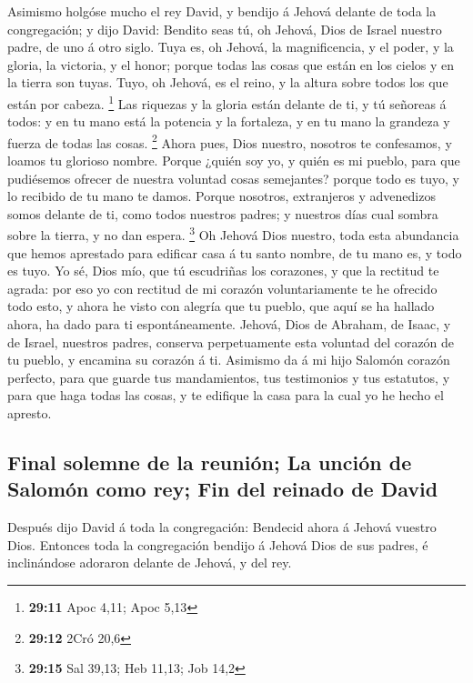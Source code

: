  Asimismo holgóse mucho el rey David, y bendijo á Jehová
delante de toda la congregación; y dijo David: Bendito seas tú, oh
Jehová, Dios de Israel nuestro padre, de uno á otro siglo. 
Tuya es, oh Jehová, la magnificencia, y el poder, y la gloria, la
victoria, y el honor; porque todas las cosas que están en los cielos y
en la tierra son tuyas. Tuyo, oh Jehová, es el reino, y la altura sobre
todos los que están por cabeza. \footnote{\textbf{29:11} Apoc 4,11; Apoc
  5,13}  Las riquezas y la gloria están delante de ti, y tú
señoreas á todos: y en tu mano está la potencia y la fortaleza, y en tu
mano la grandeza y fuerza de todas las cosas. \footnote{\textbf{29:12}
  2Cró 20,6}  Ahora pues, Dios nuestro, nosotros te
confesamos, y loamos tu glorioso nombre.  Porque ¿quién soy
yo, y quién es mi pueblo, para que pudiésemos ofrecer de nuestra
voluntad cosas semejantes? porque todo es tuyo, y lo recibido de tu mano
te damos.  Porque nosotros, extranjeros y advenedizos somos
delante de ti, como todos nuestros padres; y nuestros días cual sombra
sobre la tierra, y no dan espera. \footnote{\textbf{29:15} Sal 39,13;
  Heb 11,13; Job 14,2}  Oh Jehová Dios nuestro, toda esta
abundancia que hemos aprestado para edificar casa á tu santo nombre, de
tu mano es, y todo es tuyo.  Yo sé, Dios mío, que tú
escudriñas los corazones, y que la rectitud te agrada: por eso yo con
rectitud de mi corazón voluntariamente te he ofrecido todo esto, y ahora
he visto con alegría que tu pueblo, que aquí se ha hallado ahora, ha
dado para ti espontáneamente.  Jehová, Dios de Abraham, de
Isaac, y de Israel, nuestros padres, conserva perpetuamente esta
voluntad del corazón de tu pueblo, y encamina su corazón á ti.
 Asimismo da á mi hijo Salomón corazón perfecto, para que
guarde tus mandamientos, tus testimonios y tus estatutos, y para que
haga todas las cosas, y te edifique la casa para la cual yo he hecho el
apresto.

\hypertarget{final-solemne-de-la-reuniuxf3n-la-unciuxf3n-de-salomuxf3n-como-rey-fin-del-reinado-de-david}{%
\subsection{Final solemne de la reunión; La unción de Salomón como rey;
Fin del reinado de
David}\label{final-solemne-de-la-reuniuxf3n-la-unciuxf3n-de-salomuxf3n-como-rey-fin-del-reinado-de-david}}

 Después dijo David á toda la congregación: Bendecid ahora
á Jehová vuestro Dios. Entonces toda la congregación bendijo á Jehová
Dios de sus padres, é inclinándose adoraron delante de Jehová, y del
rey.


